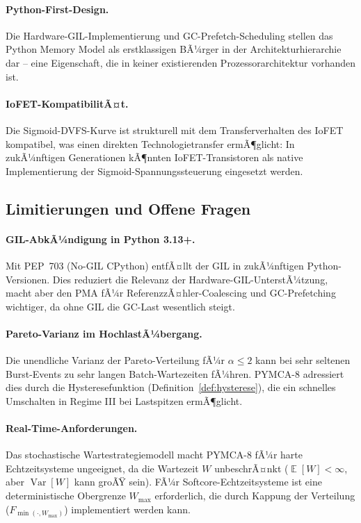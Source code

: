 ﻿\documentclass[a4paper,12pt]{scrreprt}
\theoremstyle{definition}
\DeclareMathOperator{\E}{\mathbb{E}}
\DeclareMathOperator{\Var}{Var}
\begin{document}
	\paragraph{Python-First-Design.}
	Die Hardware-GIL-Implementierung und GC-Prefetch-Scheduling stellen
	das Python Memory Model als erstklassigen BÃ¼rger in der
	Architekturhierarchie dar -- eine Eigenschaft, die in keiner existierenden
	Prozessorarchitektur vorhanden ist.
	
	\paragraph{IoFET-KompatibilitÃ¤t.}
	Die Sigmoid-DVFS-Kurve ist strukturell mit dem Transferverhalten des
	IoFET \cite{epp2026iono} kompatibel, was einen direkten Technologietransfer
	ermÃ¶glicht: In zukÃ¼nftigen Generationen kÃ¶nnten IoFET-Transistoren
	als native Implementierung der Sigmoid-Spannungssteuerung eingesetzt
	werden.
	
	\subsection{Limitierungen und Offene Fragen}
	
	\paragraph{GIL-AbkÃ¼ndigung in Python 3.13+.}
	Mit PEP~703 (No-GIL CPython) \cite{python_pep703} entfÃ¤llt der GIL
	in zukÃ¼nftigen Python-Versionen. Dies reduziert die Relevanz der
	Hardware-GIL-UnterstÃ¼tzung, macht aber den PMA fÃ¼r
	ReferenzzÃ¤hler-Coalescing und GC-Prefetching wichtiger, da ohne GIL
	die GC-Last wesentlich steigt.
	
	\paragraph{Pareto-Varianz im HochlastÃ¼bergang.}
	Die unendliche Varianz der Pareto-Verteilung fÃ¼r $\alpha \le 2$
	kann bei sehr seltenen Burst-Events zu sehr langen Batch-Wartezeiten
	fÃ¼hren. PYMCA-8 adressiert dies durch die Hysteresefunktion
	(Definition~\ref{def:hysterese}), die ein schnelles Umschalten
	in Regime III bei Lastspitzen ermÃ¶glicht.
	
	\paragraph{Real-Time-Anforderungen.}
	Das stochastische Wartestrategiemodell macht PYMCA-8 fÃ¼r harte
	Echtzeitsysteme ungeeignet, da die Wartezeit $W$ unbeschrÃ¤nkt
	($\E[W] < \infty$, aber $\Var[W]$ kann groÃŸ sein). FÃ¼r
	Softcore-Echtzeitsysteme ist eine deterministische Obergrenze
	$W_{\max}$ erforderlich, die durch Kappung der Verteilung
	($F_{\min(\cdot, W_{\max})}$) implementiert werden kann.
	
\end{document}
